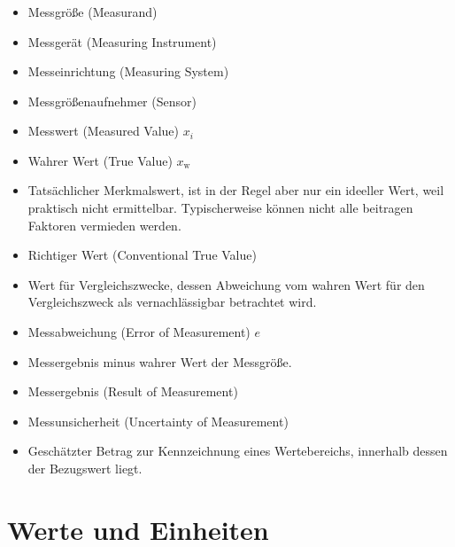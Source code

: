\begin{frame}
    \frametitle{\insertsection}
    \begin{itemize}
        \item Messgröße (Measurand)
        \item Messgerät (Measuring Instrument)
        \item Messeinrichtung (Measuring System)
        \item Messgrößenaufnehmer (Sensor)
        \item Messwert (Measured Value) $x_i$
        \item Wahrer Wert (True Value) $x_{\text{w}}$
        \item Tatsächlicher Merkmalswert, ist in der Regel aber nur ein ideeller Wert, weil praktisch nicht ermittelbar. Typischerweise können nicht alle beitragen Faktoren vermieden werden.
        \item Richtiger Wert (Conventional True Value)
        \item Wert für Vergleichszwecke, dessen Abweichung vom wahren Wert für den Vergleichszweck als vernachlässigbar betrachtet wird.
        \item Messabweichung (Error of Measurement) $e$
        \item Messergebnis minus wahrer Wert der Messgröße.
        \item Messergebnis (Result of Measurement)
        \item Messunsicherheit (Uncertainty of Measurement) %
        \item Geschätzter Betrag zur Kennzeichnung eines Wertebereichs, innerhalb dessen der Bezugswert liegt.
    \end{itemize}
\end{frame}


\section{Werte und Einheiten}

